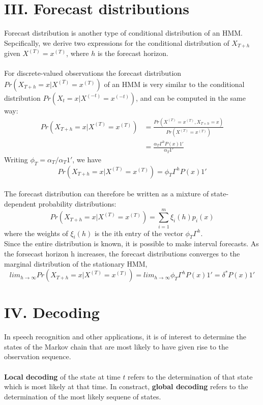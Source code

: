 \documentclass{article}
\begin{document}
\section*{III. Forecast distributions}
Forecast distribution is another type of conditional distribution of an HMM. Sepcifically, we derive two expressions for the conditional distribution of $X_{T+h}$ given $X^{(T)} = x^{(T)}$, where $h$ is the forecast horizon. \\
\\
For discrete-valued observations the forecast distribution $Pr(X_{T+h} = x | X^{(T)} = x^{(T)})$ of an HMM is very similar to the conditional distribution $Pr(X_t = x | X^{(-t)} = x^{(-t)})$, and can be computed in the same way:
\\
\begin{align}
    Pr(X_{T+h} = x | X^{(T)} = x^{(T)}) & = \frac{Pr(X^{(T)} = x^{(T)}, X_{T+h} = x)}{Pr(X^{(T)} = x^{(T)})} \\
    & = \frac{\alpha_T \Gamma^h P(x) 1'}{\alpha_T 1'}
\end{align}
Writing $\phi_T = \alpha_T / \alpha_T 1'$, we have 
$$Pr(X_{T+h} = x | X^{(T)} = x^{(T)}) = \phi_T \Gamma^h P(x) 1'$$
\\
The forecast distribution can therefore be written as a mixture of state-dependent probability distributions: 
$$Pr(X_{T+h} = x | X^{(T)} = x^{(T)}) = \sum_{i=1}^m \xi_i (h) p_i(x)$$
where the weights of $\xi_i(h)$ is the ith entry of the vector $\phi_T \Gamma^h$.
\\
Since the entire distribution is known, it is possible to make interval forecasts. As the forsecast horizon h increases, the forecast distributions converges to the marginal distribution of the stationary HMM, 
$$lim_{h \rightarrow \infty} Pr(X_{T+h} = x | X^{(T)} = x^{(T)}) = lim_{h \rightarrow \infty} \phi_T \Gamma^h P(x) 1' = \delta^* P(x) 1'$$

\section*{IV. Decoding}
In speech recognition and other applications, it is of interest to determine the states of the Markov chain that are most likely to have given rise to the observation sequence. \\
\\
\textbf{Local decoding} of the state at time $t$ refers to the determination of that state which is most likely at that time. In constract, \textbf{global decoding} refers to the determination of the most likely sequene of states. 
\end{document}
